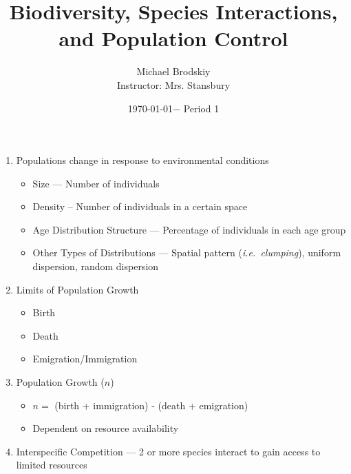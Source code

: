 \documentclass[12pt]{article}
\title{Biodiversity, Species Interactions, and Population Control}
\date{\today $-$ Period 1}
\author{Michael Brodskiy\\ \small Instructor: Mrs. Stansbury}
\begin{document}
\maketitle

\begin{enumerate}

  \item Populations change in response to environmental conditions

    \begin{itemize}

      \item Size — Number of individuals

      \item Density – Number of individuals in a certain space

      \item Age Distribution Structure — Percentage of individuals in each age group

      \item Other Types of Distributions — Spatial pattern (\textit{i.e.\ clumping}), uniform dispersion, random dispersion

    \end{itemize}

  \item Limits of Population Growth

    \begin{itemize}

      \item Birth

      \item Death

      \item Emigration/Immigration

    \end{itemize}

  \item Population Growth ($n$)

    \begin{itemize}

      \item $n=$ (birth + immigration) - (death + emigration)

      \item Dependent on resource availability

    \end{itemize}

  \item Interspecific Competition — 2 or more species interact to gain access to limited resources


\end{enumerate}
\end{document}

